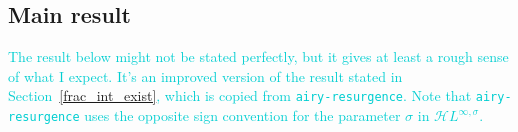 \documentclass{article}
\newtheorem{defn}{Definition}
\theoremstyle{plain}
\newcommand{\holoL}[1]{\mathcal{H}L^{#1}} %
\begin{document}
\subsection{Main result}
\textcolor{DarkTurquoise}{The result below might not be stated perfectly, but it gives at least a rough sense of what I expect. It's an improved version of the result stated in Section~\ref{frac_int_exist}, which is copied from {\tt airy-resurgence}. Note that {\tt airy-resurgence} uses the opposite sign convention for the parameter $\sigma$ in $\holoL{\infty, \sigma}$.}
\end{document}

